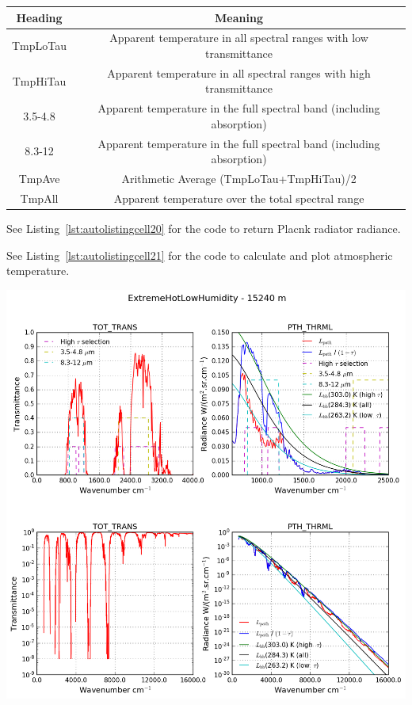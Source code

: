 \documentclass{workpackage}
\begin{document}
\begin{center}

\begin{normalsize}

\begin{tabular}{|c|c|}
\hline
Heading&Meaning\\\hline
TmpLoTau&Apparent temperature in all spectral ranges with low transmittance\\\hline
TmpHiTau&Apparent temperature in all spectral ranges with high transmittance\\\hline
3.5-4.8&Apparent temperature in the full spectral band (including absorption)\\\hline
8.3-12&Apparent temperature in the full spectral band (including absorption)\\\hline
TmpAve&Arithmetic Average (TmpLoTau+TmpHiTau)/2\\\hline
TmpAll&Apparent temperature over the total spectral range\\\hline

\end{tabular}
\end{normalsize}
\end{center}



See Listing~\ref{lst:autolistingcell20} for the code to return Placnk radiator radiance.



See Listing~\ref{lst:autolistingcell21} for the code to calculate and plot atmospheric temperature.

\begin{center}
\includegraphics{./pic/Analyse-Standard-Atmospheres_21_0.png}
\end{center}
\end{document}
